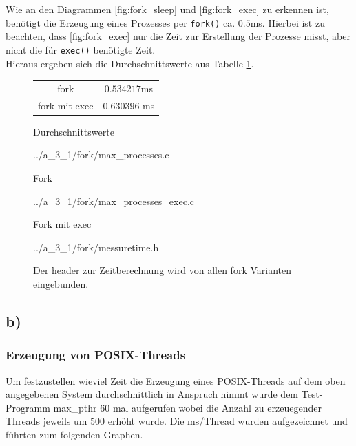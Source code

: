 \documentclass[a4paper,
12pt,
BCOR12mm,
]{scrartcl}
\begin{document}
Wie an den Diagrammen \ref{fig:fork_sleep} und \ref{fig:fork_exec} zu erkennen ist,
benötigt die Erzeugung eines Prozesses per \verb|fork()| ca. $0.5$ms.
Hierbei ist zu beachten, dass \ref{fig:fork_exec} nur die Zeit zur Erstellung der Prozesse
misst, aber nicht die für \verb|exec()| benötigte Zeit. \\
Hieraus ergeben sich die Durchschnittswerte aus Tabelle \ref{fig:fork_mean}.
\begin{figure}[h!]
	\begin{center}
		\begin{tabular}[h!]{c|c}
			\hline
			fork & $0.534217$ms	 \\
			fork mit exec & $0.630396$ ms\\
			\hline
		\end{tabular}
	\end{center}
	\caption{Durchschnittswerte}
	\label{fig:fork_mean}
\end{figure}


\begin{figure}[h!]
	\begin{center}
		 {../a_3_1/fork/max_processes.c}
	\end{center}
	\caption{Fork}
	\label{fig:fork_listing}
\end{figure}

\begin{figure}[h!]
	\begin{center}
		 {../a_3_1/fork/max_processes_exec.c}
	\end{center}
	\caption{Fork mit exec}
	\label{fig:fork_exec_listing}
\end{figure}

\begin{figure}[h!]
	\begin{center}
		 {../a_3_1/fork/messuretime.h}
	\end{center}
	\caption{Der header zur Zeitberechnung wird von allen fork Varianten eingebunden.}
	\label{fig:messuretime}
\end{figure}
\subsection{b)}
\subsubsection{Erzeugung von POSIX-Threads}
Um festzustellen wieviel Zeit die Erzeugung eines POSIX-Threads auf dem oben angegebenen System durchschnittlich
in Anspruch nimmt wurde dem Test-Programm max\_pthr 60 mal aufgerufen wobei die Anzahl zu erzeuegender Threads
jeweils um 500 erhöht wurde. Die ms/Thread wurden aufgezeichnet und führten zum folgenden Graphen.
\end{document}
